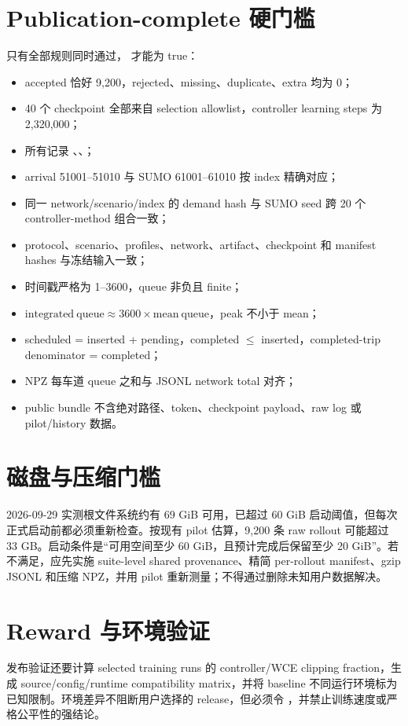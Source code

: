 \section{Publication-complete 硬门槛}
只有全部规则同时通过， 才能为 true：
\begin{itemize}
  \item accepted 恰好 9,200，rejected、missing、duplicate、extra 均为 0；
  \item 40 个 checkpoint 全部来自 selection allowlist，controller learning steps 为 2,320,000；
  \item 所有记录 、、；
  \item arrival 51001--51010 与 SUMO 61001--61010 按 index 精确对应；
  \item 同一 network/scenario/index 的 demand hash 与 SUMO seed 跨 20 个 controller-method 组合一致；
  \item protocol、scenario、profiles、network、artifact、checkpoint 和 manifest hashes 与冻结输入一致；
  \item 时间戳严格为 1--3600，queue 非负且 finite；
  \item $\mathrm{integrated\ queue}\approx3600\times\mathrm{mean\ queue}$，peak 不小于 mean；
  \item scheduled = inserted + pending，completed $\le$ inserted，completed-trip denominator = completed；
  \item NPZ 每车道 queue 之和与 JSONL network total 对齐；
  \item public bundle 不含绝对路径、token、checkpoint payload、raw log 或 pilot/history 数据。
\end{itemize}

\section{磁盘与压缩门槛}
2026-09-29 实测根文件系统约有 69 GiB 可用，已超过 60 GiB 启动阈值，但每次正式启动前都必须重新检查。按现有 pilot 估算，9,200 条 raw rollout 可能超过 33 GB。启动条件是“可用空间至少 60 GiB，且预计完成后保留至少 20 GiB”。若不满足，应先实施 suite-level shared provenance、精简 per-rollout manifest、gzip JSONL 和压缩 NPZ，并用 pilot 重新测量；不得通过删除未知用户数据解决。

\section{Reward 与环境验证}
发布验证还要计算 selected training runs 的 controller/WCE clipping fraction，生成 source/config/runtime compatibility matrix，并将 baseline 不同运行环境标为已知限制。环境差异不阻断用户选择的 release，但必须令 ，并禁止训练速度或严格公平性的强结论。
